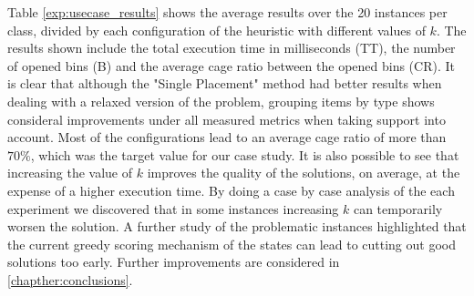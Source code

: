 Table \ref{exp:usecase_results} shows the average results over the 20 instances per class, divided by each configuration of the heuristic with different values of $k$. The results shown include the total execution time in milliseconds (TT), the number of opened bins (B) and the average cage ratio between the opened bins (CR). It is clear that although the "Single Placement" method had better results when dealing with a relaxed version of the problem, grouping items by type shows consideral improvements under all measured metrics when taking support into account.
Most of the configurations lead to an average cage ratio of more than $70\%$, which was the target value for our case study.
It is also possible to see that increasing the value of $k$ improves the quality of the solutions, on average, at the expense of a higher execution time.
By doing a case by case analysis of the each experiment we discovered that in some instances increasing $k$ can temporarily worsen the solution. 
A further study of the problematic instances highlighted that the current greedy scoring mechanism of the states can lead to cutting out good solutions too early. 
Further improvements are considered in \cref{chapther:conclusions}.
\label{exp:usecase_results}

